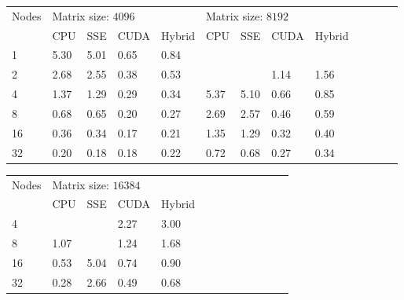 \begin{table}
\centering
\begin{tabular}{*{13}{l}}
\hline
Nodes & \multicolumn{4}{l}{Matrix size: $4096$} & \multicolumn{4}{l}{Matrix size: $8192$} \\
 & CPU & SSE & CUDA & Hybrid & CPU & SSE & CUDA & Hybrid \\
\hline
1 & 5.30 & 5.01 & 0.65 & 0.84 &  & & & \\
2 & 2.68 & 2.55 & 0.38 & 0.53 &  & & 1.14 & 1.56 \\
4 & 1.37 & 1.29 & 0.29 & 0.34 & 5.37 & 5.10 & 0.66 & 0.85 \\
8 & 0.68 & 0.65 & 0.20 & 0.27 & 2.69 & 2.57 & 0.46 & 0.59 \\
16& 0.36 & 0.34 & 0.17 & 0.21 & 1.35 & 1.29 & 0.32 & 0.40 \\
32& 0.20 & 0.18 & 0.18 & 0.22 & 0.72 & 0.68 & 0.27 & 0.34 \\
\hline
\end{tabular}
\end{table}

\begin{table}
\centering
\begin{tabular}{*{13}{l}}
\hline
Nodes & \multicolumn{4}{l}{Matrix size: $16384$} \\
 & CPU & SSE & CUDA & Hybrid \\
\hline
4 &  &  & 2.27 & 3.00 \\
8 & 1.07 &  & 1.24 & 1.68 \\
16& 0.53 & 5.04 & 0.74 & 0.90 \\
32& 0.28 & 2.66 & 0.49 & 0.68 \\
\hline
\end{tabular}
\end{table}